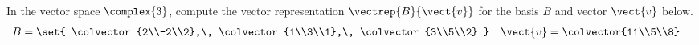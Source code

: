 In the vector space $\complex{3}$, compute the vector representation $\vectrep{B}{\vect{v}}$ for the basis $B$ and vector $\vect{v}$ below.
%
\begin{align*}
B&=\set{
\colvector{2\\-2\\2},\,
\colvector{1\\3\\1},\,
\colvector{3\\5\\2}
}
&
\vect{v}&=\colvector{11\\5\\8}
\end{align*}